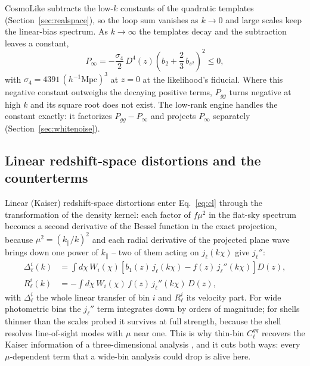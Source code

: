 \documentclass[11pt]{article}
\newcommand{\bone}{b_1}            %
\newcommand{\btwo}{b_2}            %
\newcommand{\bs}{b_{s^2}}          %
\begin{document}
CosmoLike subtracts the low-$k$ constants of the quadratic templates
(Section~\ref{sec:realspace}), so the loop sum vanishes as $k \to 0$
and large scales keep the linear-bias spectrum.  As $k \to \infty$ the
templates decay and the subtraction leaves a constant,
\begin{equation}
P_\infty = -\frac{\sigma_4}{2}\,D^4(z)
 \left(\btwo + \frac{2}{3}\,\bs\right)^2 \le 0 ,
\label{eq:pinf}
\end{equation}
with $\sigma_4 = 4391\,(h^{-1}\mathrm{Mpc})^3$ at $z = 0$ at the
likelihood's fiducial.  Where this negative constant outweighs the
decaying positive terms, $P_{gg}$ turns negative at high $k$ and its
square root does not exist.  The low-rank engine handles the constant
exactly: it factorizes $P_{gg} - P_\infty$ and projects $P_\infty$
separately (Section~\ref{sec:whitenoise}).

\subsection{Linear redshift-space distortions and the counterterms}
\label{sec:rsd-projection}

Linear (Kaiser) redshift-space distortions enter Eq.~\eqref{eq:cl}
through the transformation of the density kernel: each factor of
$f\mu^2$ in the flat-sky spectrum becomes a second derivative of the
Bessel function in the exact projection, because $\mu^2 =
(k_\parallel/k)^2$ and each radial derivative of the projected plane
wave brings down one power of $k_\parallel$ -- two of them acting on
$j_\ell(k\chi)$ give $j_\ell''$:
\begin{align}
\Delta_\ell^i(k) &= \int d\chi\,W_i(\chi)
 \left[\bone(z)\,j_\ell(k\chi) - f(z)\,j_\ell''(k\chi)\right] D(z) ,
 \nonumber\\
R_\ell^i(k) &= -\int d\chi\,W_i(\chi)\,f(z)\,j_\ell''(k\chi)\,D(z) ,
\label{eq:kaiser}
\end{align}
with $\Delta_\ell^i$ the whole linear transfer of bin $i$ and
$R_\ell^i$ its velocity part.  For wide photometric bins the
$j_\ell''$ term integrates down by orders of magnitude; for shells
thinner than the scales probed it survives at full strength, because
the shell resolves line-of-sight modes with $\mu$ near one.  This is
why thin-bin $C_\ell^{gg}$ recovers the Kaiser information of a
three-dimensional analysis \cite{Asorey2012}, and it cuts both ways:
every $\mu$-dependent term that a wide-bin analysis could drop is
alive here.
\end{document}
